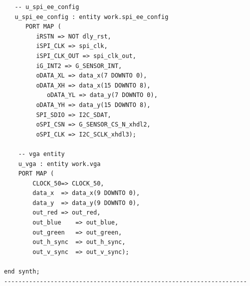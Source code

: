 \documentclass[12pt,a4paper,hyperlinks]{rapport_unif}
\begin{document}
\begin{lstlisting}
   -- u_spi_ee_config
   u_spi_ee_config : entity work.spi_ee_config 
      PORT MAP (
         iRSTN => NOT dly_rst,
         iSPI_CLK => spi_clk,
         iSPI_CLK_OUT => spi_clk_out,
         iG_INT2 => G_SENSOR_INT,
         oDATA_XL => data_x(7 DOWNTO 0),
         oDATA_XH => data_x(15 DOWNTO 8),
			oDATA_YL => data_y(7 DOWNTO 0),
         oDATA_YH => data_y(15 DOWNTO 8),
         SPI_SDIO => I2C_SDAT,
         oSPI_CSN => G_SENSOR_CS_N_xhdl2,
         oSPI_CLK => I2C_SCLK_xhdl3);   
   
	-- vga entity
    u_vga : entity work.vga
	PORT MAP (
	    CLOCK_50=> CLOCK_50,
	    data_x	=> data_x(9 DOWNTO 0),
	    data_y	=> data_y(9 DOWNTO 0),
	    out_red	=> out_red,
	    out_blue	=> out_blue,
	    out_green	=> out_green,
	    out_h_sync	=> out_h_sync,
	    out_v_sync	=> out_v_sync);

end synth;
--------------------------------------------------------------------
\end{lstlisting}
\end{document}
